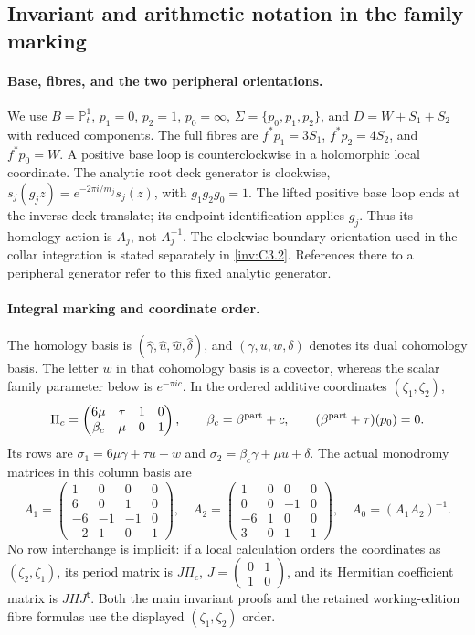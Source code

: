 \subsection{Invariant and arithmetic notation in the family marking}
\label{inv:notation-dictionary}

\paragraph{Base, fibres, and the two peripheral orientations.}
We use $B=\mathbb P^1_t$, $p_1=0$, $p_2=1$, $p_0=\infty$,
$\Sigma=\{p_0,p_1,p_2\}$, and $D=W+S_1+S_2$ with reduced
components. The full fibres are $f^*p_1=3S_1$, $f^*p_2=4S_2$,
and $f^*p_0=W$. A positive base loop is counterclockwise in a
holomorphic local coordinate. The analytic root deck generator is
clockwise, $s_j(g_jz)=e^{-2\pi i/m_j}s_j(z)$, with
$g_1g_2g_0=1$. The lifted positive base loop ends at the inverse deck
translate; its endpoint identification applies $g_j$. Thus its
homology action is $A_j$, not $A_j^{-1}$.
The clockwise boundary orientation used in the collar integration
is stated separately in \cref{inv:C3.2}. References there to a
peripheral generator refer to this fixed analytic generator.

\paragraph{Integral marking and coordinate order.}
The homology basis is
$(\hat\gamma,\hat u,\hat w,\hat\delta)$, and
$(\gamma,u,w,\delta)$ denotes its dual cohomology basis.
The letter $w$ in that cohomology basis is a covector, whereas the
scalar family parameter below is $e^{-\pi ic}$.
In the ordered additive coordinates $(\zeta_1,\zeta_2)$,
\[
 \Pi_c=\begin{pmatrix}6\mu&\tau&1&0\\
             \beta_c&\mu&0&1\end{pmatrix},
 \qquad \beta_c=\beta^{\rm part}+c,
 \qquad (\beta^{\rm part}+\tau)(p_0)=0.
\]
Its rows are $\sigma_1=6\mu\gamma+\tau u+w$ and
$\sigma_2=\beta_c\gamma+\mu u+\delta$.
The actual monodromy matrices in this column basis are
\[
 A_1=\begin{pmatrix}1&0&0&0\\6&0&1&0\\-6&-1&-1&0\\-2&1&0&1\end{pmatrix},
 \quad
 A_2=\begin{pmatrix}1&0&0&0\\0&0&-1&0\\-6&1&0&0\\3&0&1&1\end{pmatrix},
 \quad A_0=(A_1A_2)^{-1}.
\]
No row interchange is implicit: if a local calculation orders the
coordinates as $(\zeta_2,\zeta_1)$, its period matrix is
$J\Pi_c$, $J=\left(\begin{smallmatrix}0&1\\1&0\end{smallmatrix}\right)$,
and its Hermitian coefficient matrix is $JH J^{\mathsf t}$.
Both the main invariant proofs and the retained working-edition
fibre formulas use the displayed $(\zeta_1,\zeta_2)$ order.

